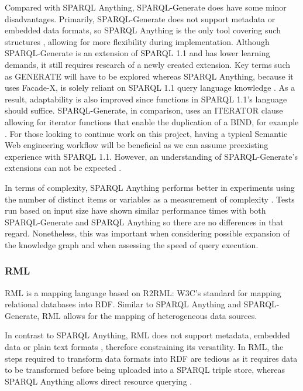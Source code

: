 Compared with SPARQL Anything, SPARQL-Generate does have some minor disadvantages. Primarily, SPARQL-Generate does not support metadata or embedded data formats, so SPARQL Anything is the only tool covering such structures \cite{sparqlanything}, allowing for more flexibility during implementation. Although SPARQL-Generate is an extension of SPARQL 1.1 and has lower learning demands, it still requires research of a newly created extension. Key terms such as GENERATE will have to be explored whereas SPARQL Anything, because it uses Facade-X, is solely reliant on SPARQL 1.1 query language knowledge \cite{sparqlanything}. As a result, adaptability is also improved since functions in SPARQL 1.1's language should suffice. SPARQL-Generate, in comparison, uses an ITERATOR clause allowing for iterator functions that enable the duplication of a BIND, for example \cite{lefranccois2017sparql}. For those looking to continue work on this project, having a typical Semantic Web engineering workflow will be beneficial as we can assume preexisting experience with SPARQL 1.1. However, an understanding of SPARQL-Generate's extensions can not be expected \cite{sparqlanything}. 

In terms of complexity, SPARQL Anything performs better in experiments using the number of distinct items or variables as a measurement of complexity \cite{sparqlanything}. Tests run based on input size have shown similar performance times with both SPARQL-Generate and SPARQL Anything so there are no differences in that regard. Nonetheless, this was important when considering possible expansion of the knowledge graph and when assessing the speed of query execution. 

\subsubsection{RML}
\hspace{0.5cm} RML is a mapping language based on R2RML: W3C's standard for mapping relational databases into RDF. Similar to SPARQL Anything and SPARQL-Generate, RML allows for the mapping of heterogeneous data sources. \cite{dimou2014rml} 

In contrast to SPARQL Anything, RML does not support metadata, embedded data or plain text formats \cite{sparqlanything}, therefore constraining its versatility. In RML, the steps required to transform data formats into RDF are tedious as it requires data to be transformed before being uploaded into a SPARQL triple store, whereas SPARQL Anything allows direct resource querying \cite{sparqlanything}.

